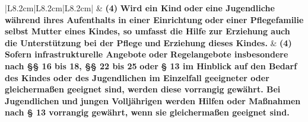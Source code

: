 \documentclass[10pt,a4paper,landscape]{article}
\begin{document}
\begin{longtable}{|L{8.2cm}|L{8.2cm}|L{8.2cm}|}
\hhline{|---|}
 & \textbf{(4) }\textbf{\textcolor{diffred}{Wird ein Kind}}\textbf{ oder }\textbf{\textcolor{diffred}{eine Jugendliche  \newline während ihres Aufenthalts in einer  \newline Einrichtung}}\textbf{ oder }\textbf{\textcolor{diffred}{einer Pflegefamilie  \newline selbst Mutter eines Kindes, so umfasst  \newline die Hilfe zur Erziehung auch die  \newline Unterstützung bei der Pflege}}\textbf{ und} \newline \textbf{\textcolor{diffred}{Erziehung dieses Kindes.}} & \textbf{(4) }\textbf{\textcolor{diffgreen}{Sofern infrastrukturelle Angebote}}\textbf{  \newline oder }\textbf{\textcolor{diffgreen}{Regelangebote insbesondere nach  \newline \S{}\S{} 16 bis 18, \S{}\S{} 22 bis 25}}\textbf{ oder }\textbf{\textcolor{diffgreen}{\S{} 13 im  \newline Hinblick auf den Bedarf des Kindes oder  \newline des Jugendlichen im Einzelfall  \newline geeigneter oder gleichermaßen geeignet  \newline sind, werden diese vorrangig gewährt.  \newline Bei Jugendlichen}}\textbf{ und }\textbf{\textcolor{diffgreen}{jungen  \newline Volljährigen werden Hilfen oder  \newline Maßnahmen nach \S{} 13 vorrangig  \newline gewährt, wenn sie gleichermaßen  \newline geeignet sind.}} \\
\hhline{|---|}

\end{longtable}
\end{document}
